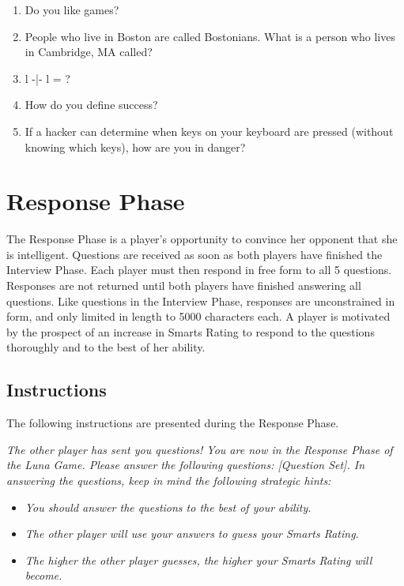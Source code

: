 \begin{enumerate}
\item Do you like games?
\item People who live in Boston are called Bostonians. What is a person who lives in Cambridge, MA called?
\item l -|- l = ?
\item How do you define success?
\item If a hacker can determine when keys on your keyboard are pressed (without knowing which keys), how are you in danger?
\end{enumerate}

\section{Response Phase}

The Response Phase is a player's opportunity to convince her opponent that she is intelligent. Questions are received as soon as both players have finished the Interview Phase. Each player must then respond in free form to all 5 questions. Responses are not returned until both players have finished answering all questions. Like questions in the Interview Phase, responses are unconstrained in form, and only limited in length to 5000 characters each. A player is motivated by the prospect of an increase in Smarts Rating to respond to the questions thoroughly and to the best of her ability.

\subsection{Instructions}

The following instructions are presented during the Response Phase.
\begin{center}
\textit{The other player has sent you questions! You are now in the Response Phase of the Luna Game. Please answer the following questions: [Question Set]. In answering the questions, keep in mind the following strategic hints:}
\begin{itemize}
\item \textit{You should answer the questions to the best of your ability.}
\item \textit{The other player will use your answers to guess your Smarts Rating.}
\item \textit{The higher the other player guesses, the higher your Smarts Rating will become.}
\end{itemize}
\end{center}

